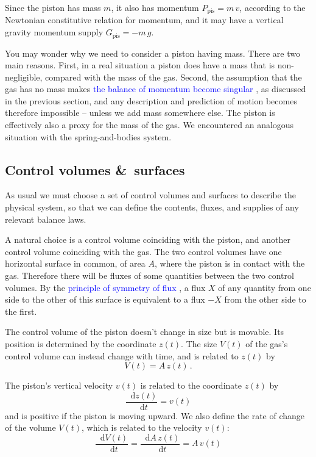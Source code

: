 \documentclass[a4paper,12pt,%
onecolumn,oneside,%
british%
]{memoir}
\newcommand*{\amp}{\&}
\newcommand*{\di}{\mathop{}\!\mathrm{d}}%
\renewcommand*{\|}[1][]{\nonscript\:#1\vert\nonscript\:\mathopen{}}
\newcommand*{\sect}{\S}%
\renewcommand*{\autoref}[3][\sect\,\ref]{\textcolor{blue}{#3}
\raisebox{0.6ex}{\color{blue}\miniscule%
\faIcon{angle-right}%
\;#1{#2}\;p.\,\pageref{#2}}}
\newcommand*{\dt}{\di t}
\newcommand*{\ym}{m}%
\newcommand*{\yPpi}{P_{\textrm{pis}}}
\newcommand*{\yGpi}{G_{\textrm{pis}}}
\begin{document}
Since the piston has mass $\ym$, it also has momentum $\yPpi=\ym\,v$, according to the Newtonian constitutive relation for momentum, and it may have a vertical gravity momentum supply $\yGpi = -\ym\,g$.

You may wonder why we need to consider a piston having mass. There are two main reasons. First, in a real situation a piston does have a mass that is non-negligible, compared with the mass of the gas. Second, the assumption that the gas has no mass makes \autoref{sec:further_idealgas}{the balance of momentum become singular}, as discussed in the previous section, and any description and prediction of motion becomes therefore impossible -- unless we add mass somewhere else. The piston is effectively also a proxy for the mass of the gas. We encountered an analogous situation with the spring-and-bodies system.

\subsection{Control volumes \amp\ surfaces}
\label{sec:idealgas_ex_control}

As usual we must choose a set of control volumes and surfaces to describe the physical system, so that we can define the contents, fluxes, and supplies of any relevant balance laws.

A natural choice is a control volume coinciding with the piston, and another control volume coinciding with the gas. The two control volumes have one horizontal surface in common, of area $A$, where the piston is in contact with the gas. Therefore there will be fluxes of some quantities between the two control volumes. By the \autoref{def:symmetryflux}{principle of symmetry of flux}, a flux $X$ of any quantity from one side to the other of this surface is equivalent to a flux $-X$ from the other side to the first.

The control volume of the piston doesn't change in size but is movable. Its position is determined by the coordinate $z(t)$. The size $V(t)$ of the gas's control volume can instead change with time, and is related to $z(t)$ by
\begin{equation}\label{eq:Vz_gas}
  V(t) = A\,z(t) \,.
\end{equation}

The piston's vertical velocity $v(t)$ is related to the coordinate $z(t)$ by
\begin{equation*}
  \frac{\di z(t)}{\dt} = v(t)
\end{equation*}
and is positive if the piston is moving upward. We also define the rate of change of the volume $V(t)$, which is related to the velocity $v(t)$:
\begin{equation}\label{eq:Vv_gas}
  \frac{\di V(t)}{\dt} = \frac{\di A\, z(t)}{\dt} = A\,v(t)
\end{equation}
\end{document}

